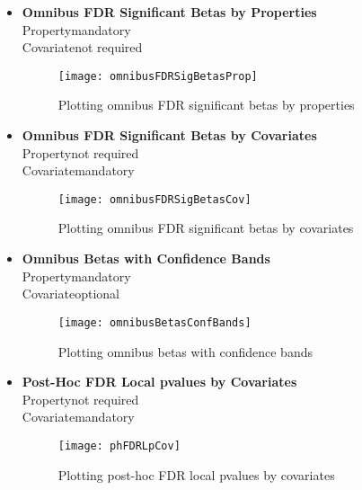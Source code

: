 \documentclass[fadttsterUserGuide_use]{subfiles}
\begin{document}
\begin{itemize}
		\item \textbf{Omnibus FDR Significant Betas by Properties}\\
		Property\textrightarrow mandatory\\
		Covariate\textrightarrow not required
		\begin{figure}[H]
  			\texttt{[image: omnibusFDRSigBetasProp]}
  			\caption{Plotting omnibus FDR significant betas by properties}
    		\label{fig:omnibusFDRSigBetasProp}
		\end{figure}
		\item \textbf{Omnibus FDR Significant Betas by Covariates}\\
		Property\textrightarrow not required\\
		Covariate\textrightarrow mandatory
		\begin{figure}[H]
  			\texttt{[image: omnibusFDRSigBetasCov]}
  			\caption{Plotting omnibus FDR significant betas by covariates}
    		\label{fig:omnibusFDRSigBetasCov}
		\end{figure}
		\vfill
		\newpage
		
		\item \textbf{Omnibus Betas with Confidence Bands}\\
		Property\textrightarrow mandatory\\
		Covariate\textrightarrow optional
		\begin{figure}[H]
  			\texttt{[image: omnibusBetasConfBands]}
  			\caption{Plotting omnibus betas with confidence bands}
    		\label{fig:omnibusBetasConfBands}
		\end{figure}
		\item \textbf{Post-Hoc FDR Local pvalues by Covariates}\\
		Property\textrightarrow not required\\
		Covariate\textrightarrow mandatory
		\begin{figure}[H]
  			\texttt{[image: phFDRLpCov]}
  			\caption{Plotting post-hoc FDR local pvalues by covariates}
    		\label{fig:phFDRLpCov}
		\end{figure}
		\vfill
		\newpage
		

\end{itemize}
\end{document}
